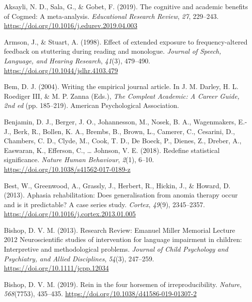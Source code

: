 \documentclass{krantz}
\newlength{\cslhangindent}
\newlength{\cslentryspacingunit} %
\newenvironment{CSLReferences}[2] %
{%
\setlength{\parindent}{0pt}
\ifodd #1
\let\oldpar\par
\def\par{\hangindent=\cslhangindent\oldpar}
\fi
\setlength{\parskip}{#2\cslentryspacingunit}
}%
{}
\begin{document}
\hypertarget{refs}{}
\begin{CSLReferences}{1}{0}

\leavevmode{}%
Aksayli, N. D., Sala, G., \& Gobet, F. (2019). The cognitive and academic benefits of {Cogmed}: {A} meta-analysis. \emph{Educational Research Review}, \emph{27}, 229--243. \url{https://doi.org/10.1016/j.edurev.2019.04.003}

\leavevmode{}%
Armson, J., \& Stuart, A. (1998). Effect of extended exposure to frequency-altered feedback on stuttering during reading and monologue. \emph{Journal of Speech, Language, and Hearing Research}, \emph{41}(3), 479--490. \url{https://doi.org/10.1044/jslhr.4103.479}

\leavevmode{}%
Bem, D. J. (2004). Writing the empirical journal article. In J. M. Darley, H. L. Roediger III, \& M. P. Zanna (Eds.), \emph{The {Compleat Academic}: {A Career Guide}, 2nd ed} (pp. 185--219). {American Psychological Association}.

\leavevmode{}%
Benjamin, D. J., Berger, J. O., Johannesson, M., Nosek, B. A., Wagenmakers, E.-J., Berk, R., Bollen, K. A., Brembs, B., Brown, L., Camerer, C., Cesarini, D., Chambers, C. D., Clyde, M., Cook, T. D., De Boeck, P., Dienes, Z., Dreber, A., Easwaran, K., Efferson, C., \ldots{} Johnson, V. E. (2018). Redefine statistical significance. \emph{Nature Human Behaviour}, \emph{2}(1), 6--10. \url{https://doi.org/10.1038/s41562-017-0189-z}

\leavevmode{}%
Best, W., Greenwood, A., Grassly, J., Herbert, R., Hickin, J., \& Howard, D. (2013). Aphasia rehabilitation: {Does} generalisation from anomia therapy occur and is it predictable? {A} case series study. \emph{Cortex}, \emph{49}(9), 2345--2357. \url{https://doi.org/10.1016/j.cortex.2013.01.005}

\leavevmode{}%
Bishop, D. V. M. (2013). Research {Review}: {Emanuel Miller Memorial Lecture} 2012 \textendash{} {Neuroscientific} studies of intervention for language impairment in children: Interpretive and methodological problems. \emph{Journal of Child Psychology and Psychiatry, and Allied Disciplines}, \emph{54}(3), 247--259. \url{https://doi.org/10.1111/jcpp.12034}

\leavevmode{}%
Bishop, D. V. M. (2019). Rein in the four horsemen of irreproducibility. \emph{Nature}, \emph{568}(7753), 435--435. \url{https://doi.org/10.1038/d41586-019-01307-2}


\end{CSLReferences}
\end{document}
